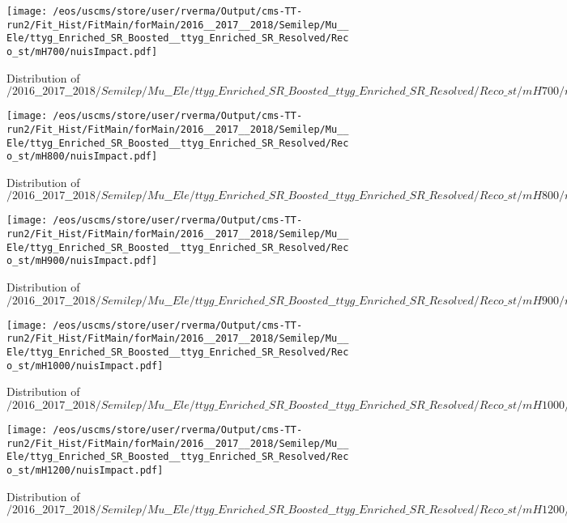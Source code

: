 \begin{figure}
\centering
\texttt{[image: /eos/uscms/store/user/rverma/Output/cms-TT-run2/Fit\_Hist/FitMain/forMain/2016\_\_2017\_\_2018/Semilep/Mu\_\_Ele/ttyg\_Enriched\_SR\_Boosted\_\_ttyg\_Enriched\_SR\_Resolved/Reco\_st/mH700/nuisImpact.pdf]}
\caption{Distribution of $/2016\_\_2017\_\_2018/Semilep/Mu\_\_Ele/ttyg\_Enriched\_SR\_Boosted\_\_ttyg\_Enriched\_SR\_Resolved/Reco\_st/mH700/nuisImpact.pdf$}
\end{figure}

\begin{figure}
\centering
\texttt{[image: /eos/uscms/store/user/rverma/Output/cms-TT-run2/Fit\_Hist/FitMain/forMain/2016\_\_2017\_\_2018/Semilep/Mu\_\_Ele/ttyg\_Enriched\_SR\_Boosted\_\_ttyg\_Enriched\_SR\_Resolved/Reco\_st/mH800/nuisImpact.pdf]}
\caption{Distribution of $/2016\_\_2017\_\_2018/Semilep/Mu\_\_Ele/ttyg\_Enriched\_SR\_Boosted\_\_ttyg\_Enriched\_SR\_Resolved/Reco\_st/mH800/nuisImpact.pdf$}
\end{figure}

\begin{figure}
\centering
\texttt{[image: /eos/uscms/store/user/rverma/Output/cms-TT-run2/Fit\_Hist/FitMain/forMain/2016\_\_2017\_\_2018/Semilep/Mu\_\_Ele/ttyg\_Enriched\_SR\_Boosted\_\_ttyg\_Enriched\_SR\_Resolved/Reco\_st/mH900/nuisImpact.pdf]}
\caption{Distribution of $/2016\_\_2017\_\_2018/Semilep/Mu\_\_Ele/ttyg\_Enriched\_SR\_Boosted\_\_ttyg\_Enriched\_SR\_Resolved/Reco\_st/mH900/nuisImpact.pdf$}
\end{figure}

\begin{figure}
\centering
\texttt{[image: /eos/uscms/store/user/rverma/Output/cms-TT-run2/Fit\_Hist/FitMain/forMain/2016\_\_2017\_\_2018/Semilep/Mu\_\_Ele/ttyg\_Enriched\_SR\_Boosted\_\_ttyg\_Enriched\_SR\_Resolved/Reco\_st/mH1000/nuisImpact.pdf]}
\caption{Distribution of $/2016\_\_2017\_\_2018/Semilep/Mu\_\_Ele/ttyg\_Enriched\_SR\_Boosted\_\_ttyg\_Enriched\_SR\_Resolved/Reco\_st/mH1000/nuisImpact.pdf$}
\end{figure}

\begin{figure}
\centering
\texttt{[image: /eos/uscms/store/user/rverma/Output/cms-TT-run2/Fit\_Hist/FitMain/forMain/2016\_\_2017\_\_2018/Semilep/Mu\_\_Ele/ttyg\_Enriched\_SR\_Boosted\_\_ttyg\_Enriched\_SR\_Resolved/Reco\_st/mH1200/nuisImpact.pdf]}
\caption{Distribution of $/2016\_\_2017\_\_2018/Semilep/Mu\_\_Ele/ttyg\_Enriched\_SR\_Boosted\_\_ttyg\_Enriched\_SR\_Resolved/Reco\_st/mH1200/nuisImpact.pdf$}
\end{figure}

